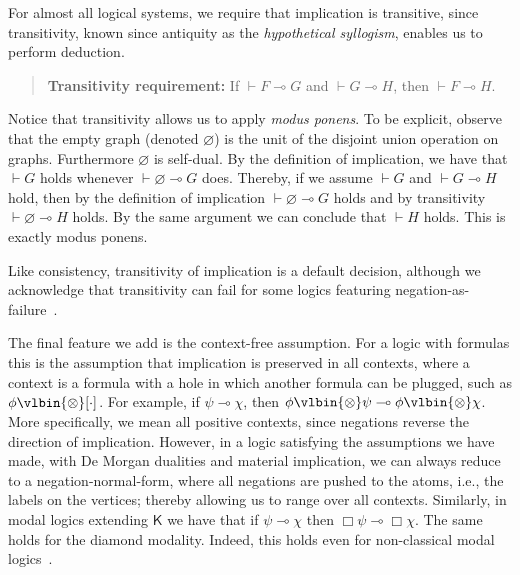 \documentclass{lmcs} %
\renewcommand{\emptyset}{\varnothing}
\def\unit{\emptyset}
\newcommand{\coonso}[1]{[\cdot]_{#1}}
\def\ltens{\vlbin{\otimes}}
\def\gG{G}
\def\gH{H}
\theoremstyle{plain}
\begin{document}
For almost all logical systems, we require that implication is transitive,
since transitivity, known since antiquity as the \textit{hypothetical syllogism},  enables us to perform deduction.
\begin{quote}
	\textbf{Transitivity requirement:} If $\vdash F \multimap G$ and $\vdash G \multimap H$, then $\vdash F \multimap H$.
\end{quote}
Notice that transitivity allows us to apply 
\textit{modus ponens}. 
To be explicit, observe that the empty graph (denoted $\unit$) is the unit of the disjoint union operation on graphs. Furthermore $\unit$ is self-dual.
By the definition of implication, we have that $\vdash \gG$ holds whenever $\vdash \unit \multimap \gG$ does. 
Thereby, if we assume $\vdash \gG$ and $\vdash \gG \multimap \gH$ hold,
then by the definition of implication $\vdash \unit \multimap \gG$ holds and by transitivity 
$\vdash \unit \multimap \gH$ holds. 
By the same argument we can conclude that $\vdash \gH$ holds. 
This is exactly modus ponens.

Like consistency, transitivity of implication is a default decision, although we acknowledge that transitivity can fail for some logics featuring negation-as-failure~\cite{Bonner1990}.

The final feature we add is the context-free assumption.
For a logic with formulas this is the assumption that implication is preserved in all contexts, where a context is a formula with a hole in which another formula can be plugged, such as $\phi \ltens \coonso{}$.
For example, if $\psi \multimap \chi$, then $\phi \ltens \psi \multimap \phi \ltens \chi$.
More specifically, we mean all positive contexts, since negations reverse the direction of implication. However, in a logic satisfying the assumptions we have made, with De Morgan dualities and material implication, we can always reduce to a negation-normal-form, where all negations are pushed to the atoms, i.e., the labels on the vertices; thereby allowing us to range over all contexts.
Similarly, in modal logics extending $\mathsf K$ we have that if $\psi \multimap \chi$ then $\Box \psi \multimap \Box \chi$. The same holds for the diamond modality. Indeed, this holds even for non-classical modal logics~\cite{marin:str:aiml14}.
\end{document}
